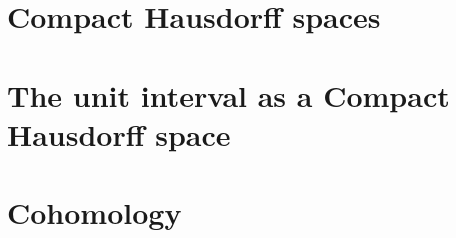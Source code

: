 \documentclass{zariski}
\begin{document}
\section{Compact Hausdorff spaces}




\section{The unit interval as a Compact Hausdorff space}

%

 

\section{Cohomology}


%


\printbibliography
\end{document}
